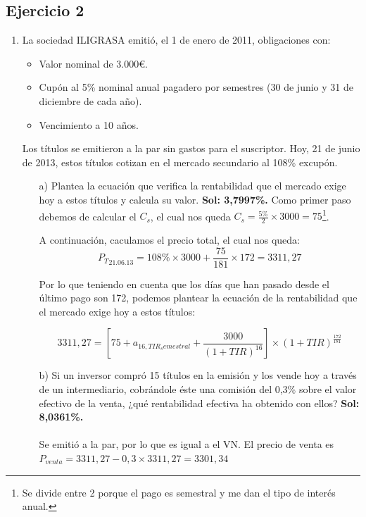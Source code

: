 

\subsection*{Ejercicio 2}

\begin{enumerate}
    \item La sociedad ILIGRASA emitió, el 1 de enero de 2011, obligaciones con:
    \begin{itemize}
        \item Valor nominal de 3.000€.
        \item Cupón al 5\% nominal anual pagadero por semestres (30 de junio y 31 de diciembre de cada año).
        \item Vencimiento a 10 años.
    \end{itemize}
    Los títulos se emitieron a la par sin gastos para el suscriptor. Hoy, 21 de junio de 2013, estos títulos cotizan en el mercado secundario al 108\% excupón.

    \begin{enumerate}
        \item[a)] Plantea la ecuación que verifica la rentabilidad que el mercado exige hoy a estos títulos y calcula su valor. \textbf{Sol: 3,7997\%.}
        Como primer paso debemos de calcular el $C_s$, el cual nos queda $C_s = \frac{5\%}{2} \times 3000 = 75$\footnote{Se divide entre 2 porque el pago es semestral y me dan el tipo de interés anual.}. 

        A continuación, caculamos el precio total, el cual nos queda:
        \begin{equation*}
            {P_T}_{\textit{21.06.13}} = 108\% \times 3000 + \frac{75}{181} \times 172 = 3311,27
        \end{equation*}

        Por lo que teniendo en cuenta que los días que han pasado desde el último pago son 172, podemos plantear la ecuación de la rentabilidad que el mercado exige hoy a estos títulos:

        \begin{equation*}
            3311,27 = \left[75 + a_{16,TIR_semestral} + \frac{3000}{(1+TIR)^{16}}\right] \times (1+TIR)^{\frac{172}{181}}
        \end{equation*}
        \item[b)] Si un inversor compró 15 títulos en la emisión y los vende hoy a través de un intermediario, cobrándole éste una comisión del 0,3\% sobre el valor efectivo de la venta, ¿qué rentabilidad efectiva ha obtenido con ellos? \textbf{Sol: 8,0361\%.}\\\\
        Se emitió a la par, por lo que es igual a el VN.
        El precio de venta es $ P_{venta} = 3311,27 -0,3 \times 3311,27 = 3301,34$


\end{enumerate}
\end{enumerate}
